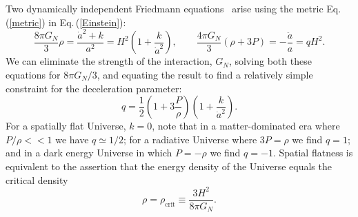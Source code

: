 \documentclass[universe,article,submit,moreauthors,pdftex,a4paper]{Definitions/mdpi}
\newcommand{\beqn}{\begin{equation}}
\newcommand{\eeqn}{\end{equation}}
\newcommand{\req}[1]{Eq.\,(\ref{#1})}
\begin{document}
Two dynamically independent Friedmann equations~\cite{weinberg1972gravitation} arise using the metric \req{metric} in \req{Einstein}:
\beqn\label{hubble}
\frac{8\pi G_N}{3} \rho = \frac{\dot a^2+k}{a^2}
=H^2\left( 1+\frac { k }{\dot a^2}\right),
\qquad
\frac{4\pi G_N}{3} (\rho+3P) =-\frac{\ddot a}{a}=qH^2.
\eeqn
We can eliminate the strength of the interaction, $G_N$, solving both these equations for ${8\pi G_N}/{3}$, and equating the result to find a relatively simple constraint for the deceleration parameter:
\beqn\label{qparam}
q=\frac 1 2 \left(1+3\frac{P}{\rho}\right)\left(1+\frac{k}{\dot a^2}\right).
\eeqn
For a spatially flat Universe, $k=0$, note that in a matter-dominated era where $P/\rho<<1$ we have $q\simeq 1/2$; for a radiative Universe where $3P=\rho$ we find $q= 1 $; and in a dark energy Universe in which $P=-\rho$ we find $q=-1$. Spatial flatness is equivalent to the assertion that the energy density of the Universe equals the critical density
\begin{equation}\label{crit_density}
\rho=\rho_{\text{crit}}\equiv \frac{3H^2}{8\pi G_N}.
\end{equation}
\end{document}
